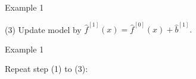 \begin{vbframe}{Example 1}
\begin{footnotesize}
\vfill

(3) Update model by $\hat{f}^{[1]}(x) = \hat{f}^{[0]}(x) + \hat{b}^{[1]}.$
\end{footnotesize}

\end{vbframe}


\begin{frame}{Example 1}

\footnotesize
Repeat step (1) to (3):

\begin{center}

\end{center}
\end{frame}
